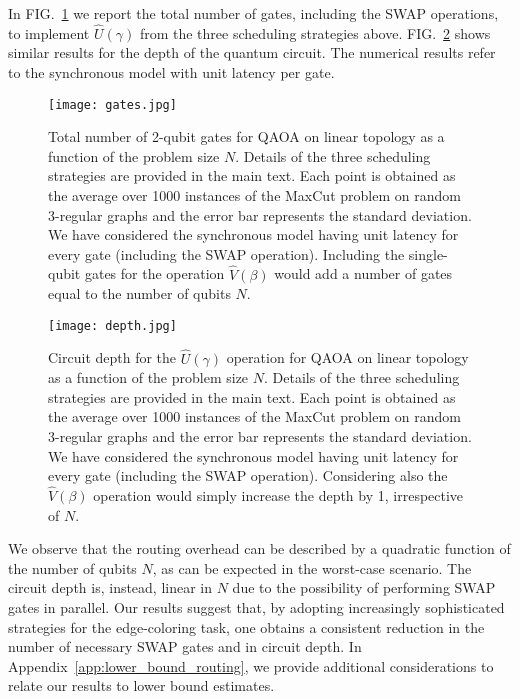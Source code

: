 \documentclass[%
onecolumn,pra,
superscriptaddress,
nofootinbib,
 amsmath,amssymb,
 aps,
11pt,
]{revtex4-1}
\def\note#1{\textbf{\color{red}[#1]}}
\begin{document}
In FIG.~\ref{fig:QAOA_gates} we report the total number of gates, including the SWAP operations, to implement $\hat{U}(\gamma)$ from the three scheduling strategies above. FIG.~\ref{fig:QAOA_depth} shows similar results for the depth of the quantum circuit. The numerical results refer to the synchronous model with unit latency per gate.

\begin{figure}[t!]
\centering
\texttt{[image: gates.jpg]}
\caption{Total number of 2-qubit gates for QAOA on linear topology as a function of the problem size $N$. Details of the three scheduling strategies are provided in the main text. Each point is obtained as the average over 1000 instances of the MaxCut problem on random 3-regular graphs and the error bar represents the standard deviation. We have considered the synchronous model having unit latency for every gate (including the SWAP operation). Including the single-qubit gates for the operation $\hat{V}(\beta)$ would add a number of gates equal to the number of qubits $N$.}\label{fig:QAOA_gates}
\end{figure}
\begin{figure}[h!]
\centering
\texttt{[image: depth.jpg]}
\caption{Circuit depth for the $\hat{U}(\gamma)$ operation for QAOA on linear topology as a function of the problem size $N$. Details of the three scheduling strategies are provided in the main text. Each point is obtained as the average over 1000 instances of the MaxCut problem on random 3-regular graphs and the error bar represents the standard deviation. We have considered the synchronous model having unit latency for every gate (including the SWAP operation). Considering also the $\hat{V}(\beta)$ operation would simply increase the depth by 1, irrespective of $N$.
}\label{fig:QAOA_depth}
\end{figure}

We observe that the routing overhead can be described by a quadratic function of the number of qubits $N$, as can be expected in the worst-case scenario. The circuit depth is, instead, linear in $N$ due to the possibility of performing SWAP gates in parallel. Our results suggest that, by adopting increasingly sophisticated strategies for the edge-coloring task, one obtains a consistent reduction in the number of necessary SWAP gates and in circuit depth. In Appendix~\ref{app:lower_bound_routing}, we provide additional considerations to relate our results to lower bound estimates.
\end{document}
